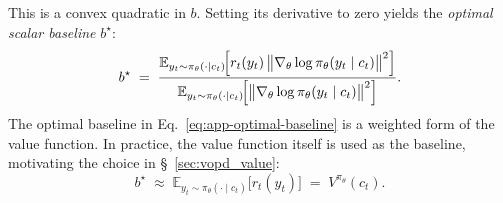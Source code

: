 \documentclass{article}
\begin{document}
This is a convex quadratic in $b$. Setting its derivative to zero yields the
\emph{optimal scalar baseline} $b^\star$:
\begin{equation}
\label{eq:app-optimal-baseline}
b^\star
\;=\;
\frac{
  \mathbb{E}_{y_t \sim \pi_\theta(\cdot\mid c_t)}\!\Bigl[
    r_t(y_t)\,\bigl\|\nabla_\theta\log\pi_\theta(y_t\mid c_t)\bigr\|^2
  \Bigr]
}{
  \mathbb{E}_{y_t \sim \pi_\theta(\cdot\mid c_t)}\!\Bigl[
    \bigl\|\nabla_\theta\log\pi_\theta(y_t\mid c_t)\bigr\|^2
  \Bigr]
}.
\end{equation}
The optimal baseline in Eq.~\eqref{eq:app-optimal-baseline} is a weighted form of
the value function. In practice, the value function itself is used as the baseline,
motivating the choice in \S~\ref{sec:vopd_value}:
\begin{equation}
    b^\star
\;\approx\;
\mathbb{E}_{y_t \sim \pi_\theta(\cdot\mid c_t)}\!\bigl[r_t(y_t)\bigr]
\;=\; V^{\pi_\theta}(c_t).
\end{equation}
\end{document}
